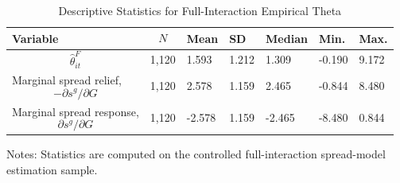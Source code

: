 \begin{table}[H]\centering
\begin{threeparttable}
\caption{Descriptive Statistics for Full-Interaction Empirical Theta}
\label{tab:theta_descriptive_stats}
\scriptsize
\begin{tabularx}{\textwidth}{lYYYYYY}
\toprule
Variable & $$N$$ & Mean & SD & Median & Min. & Max. \\
\midrule
$$\widehat{\theta}^{F}_{it}$$ & 1,120 & 1.593 & 1.212 & 1.309 & -0.190 & 9.172 \\
Marginal spread relief, $$-\partial s^g/\partial G$$ & 1,120 & 2.578 & 1.159 & 2.465 & -0.844 & 8.480 \\
Marginal spread response, $$\partial s^g/\partial G$$ & 1,120 & -2.578 & 1.159 & -2.465 & -8.480 & 0.844 \\
\bottomrule
\end{tabularx}
\begin{tablenotes}[flushleft]\footnotesize
\item Notes: Statistics are computed on the controlled full-interaction spread-model estimation sample.
\end{tablenotes}
\end{threeparttable}
\end{table}
